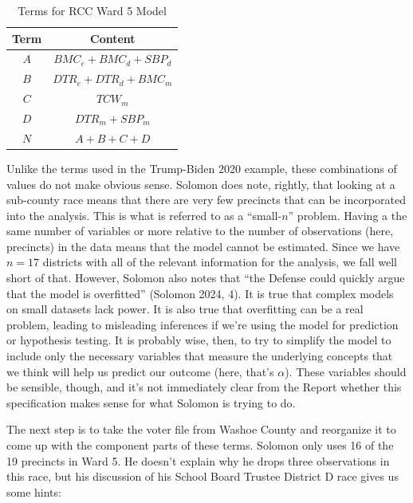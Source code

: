 \documentclass[12pt]{article}
\begin{document}
\begin{table}[ht]
\centering
\caption{Terms for RCC Ward 5 Model}
\label{tab:renodata}
\begin{tabular}{cc}
\hline
Term & Content \\
\hline
$A$ & $BMC_e + BMC_d +SBP_d$ \\
$B$ & $DTR_e + DTR_d + BMC_m$ \\
$C$ & $TCW_m$ \\
$D$ & $DTR_m + SBP_m$ \\
$N$ & $A+B+C+D$ \\
\hline
\end{tabular}
\end{table}

Unlike the terms used in the Trump-Biden 2020 example, these combinations of values do not make obvious sense. Solomon does note, rightly, that looking at a sub-county race means that there are very few precincts that can be incorporated into the analysis. This is what is referred to as a ``small-\(n\)'' problem. Having a the same number of variables or more relative to the number of observations (here, precincts) in the data means that the model cannot be estimated. Since we have \(n=17\) districts with all of the relevant information for the analysis, we fall well short of that. However, Solomon also notes that ``the Defense could quickly argue that the model is overfitted'' (Solomon 2024, 4). It is true that complex models on small datasets lack power. It is also true that overfitting can be a real problem, leading to misleading inferences if we're using the model for prediction or hypothesis testing. It is probably wise, then, to try to simplify the model to include only the necessary variables that measure the underlying concepts that we think will help us predict our outcome (here, that's \(\alpha\)). These variables should be sensible, though, and it's not immediately clear from the Report whether this specification makes sense for what Solomon is trying to do.

The next step is to take the voter file from Washoe County and reorganize it to come up with the component parts of these terms. Solomon only uses 16 of the 19 precincts in Ward 5. He doesn't explain why he drops three observations in this race, but his discussion of his School Board Trustee District D race gives us some hints:
\end{document}
